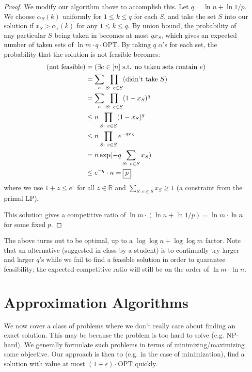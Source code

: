 \documentclass[11pt]{article}
\let\Pr\relax
\DeclareMathOperator*{\Pr}{\mathbb{P}}
\begin{document}
\begin{proof}
We modify our algorithm above to accomplish this.  Let $q = \ln n + \ln 1/p$.  We choose $\alpha_S(k)$ uniformly for $1 \le k \le q$ for each $S$, and take the set $S$ into our solution if $x_S > \alpha_s(k)$ for any $1 \le k \le q$.  By union bound, the probability of any particular $S$ being taken in becomes at most $q x_S$, which gives an expected number of taken sets of $\ln m \cdot q \cdot \text{OPT}$.  By taking $q$ $\alpha$'s for each set, the probability that the solution is not feasible becomes:
\begin{align*}
\Pr(\text{not feasible}) &= \Pr(\exists e \in [n] \text{ s.t. no taken sets contain } e) \\
&= \sum_e \prod_{S\text{: } e \in S} \Pr(\text{didn't take } S) \\
&= \sum_e \prod_{S\text{: } e \in S} (1-x_S)^q \\
&\le n \prod_{S\text{: } e \in S} (1-x_S)^q \\
&\le n \prod_{S\text{: } e \in S} e^{-qx_S} \\
&= n \exp(-q \sum_{S\text{: } e \in S} x_S) \\
&\le e^{-q}\cdot n = \boxed{p}
\end{align*}
where we use $1 + z \le e^z$ for all $z \in \mathbb{R}$ and $\sum_{S\text{: } e \in S} x_S \ge 1$ (a constraint from the primal LP).  

This solution gives a competitive ratio of $\ln m \cdot (\ln n + \ln 1/p) = \boxed{\ln m \cdot \ln n}$ for some fixed $p$.

\end{proof}

The above turns out to be optimal, up to a $\log \log n + \log \log m$ factor.  Note that an alternative (suggested in class by a student) is to continually try larger and larger $q$'s while we fail to find a feasible solution in order to guarantee feasibility; the expected competitive ratio will still be on the order of $\ln m \cdot \ln n$.

\section{Approximation Algorithms}
We now cover a class of problems where we don't really care about finding an exact solution.  This may be because the problem is too hard to solve (e.g. NP-hard).  We generally formulate such problems in terms of minimizing/maximizing some objective.  Our approach is then to (e.g. in the case of minimization), find a solution with value at most $(1 + \epsilon) \cdot \text{OPT}$ quickly.  
\end{document}
